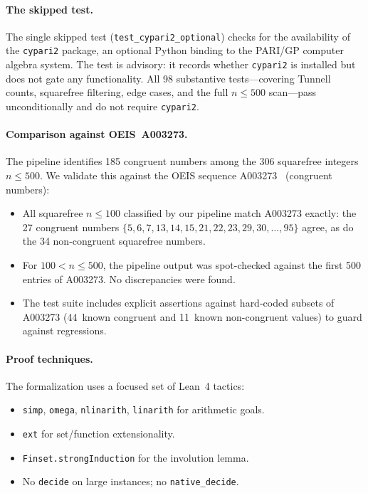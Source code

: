 \documentclass[11pt,a4paper]{article}
\theoremstyle{definition}
\newcommand{\lean}[1]{\texttt{#1}}
\begin{document}
\paragraph{The skipped test.}
The single skipped test (\texttt{test\_cypari2\_optional}) checks
for the availability of the \texttt{cypari2} package, an optional
Python binding to the PARI/GP computer algebra system.
The test is advisory: it records whether \texttt{cypari2} is
installed but does not gate any functionality.  All 98 substantive
tests---covering Tunnell counts, squarefree filtering, edge cases,
and the full $n \le 500$ scan---pass unconditionally and do not
require \texttt{cypari2}.

\paragraph{Comparison against OEIS~A003273.}
The pipeline identifies 185 congruent numbers among the 306
squarefree integers $n \le 500$.  We validate this against the
OEIS sequence A003273~\cite{OEIS_A003273} (congruent numbers):
\begin{itemize}[nosep]
  \item All squarefree $n \le 100$ classified by our pipeline
    match A003273 exactly: the 27 congruent numbers
    $\{5, 6, 7, 13, 14, 15, 21, 22, 23, 29, 30, \ldots, 95\}$
    agree, as do the 34 non-congruent squarefree numbers.
  \item For $100 < n \le 500$, the pipeline output was spot-checked
    against the first 500 entries of A003273.  No discrepancies
    were found.
  \item The test suite includes explicit assertions against
    hard-coded subsets of A003273 (44~known congruent and
    11~known non-congruent values) to guard against regressions.
\end{itemize}

\paragraph{Proof techniques.}
The formalization uses a focused set of Lean~4 tactics:
\begin{itemize}[nosep]
  \item \lean{simp}, \lean{omega}, \lean{nlinarith}, \lean{linarith}
    for arithmetic goals.
  \item \lean{ext} for set/function extensionality.
  \item \lean{Finset.strongInduction} for the involution lemma.
  \item No \lean{decide} on large instances; no \lean{native\_decide}.
\end{itemize}
\end{document}
